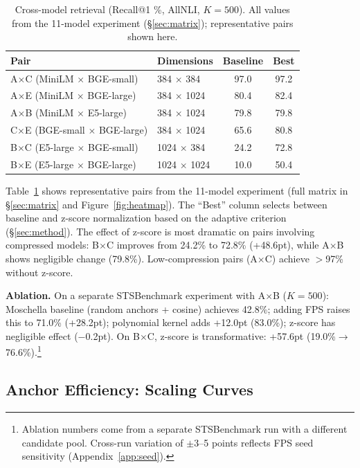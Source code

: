 \documentclass{article}
\begin{document}
\begin{table}[t]
\centering
\caption{Cross-model retrieval (Recall@1 \%, AllNLI, $K{=}500$). All values from the 11-model experiment (\S\ref{sec:matrix}); representative pairs shown here.}
\label{tab:text}
\begin{tabular}{@{}llcc@{}}
\toprule
Pair & Dimensions & Baseline & Best \\
\midrule
A$\times$C (MiniLM $\times$ BGE-small)  & 384 $\times$ 384   & 97.0 & 97.2 \\
A$\times$E (MiniLM $\times$ BGE-large)  & 384 $\times$ 1024  & 80.4 & 82.4 \\
A$\times$B (MiniLM $\times$ E5-large)   & 384 $\times$ 1024  & 79.8 & 79.8 \\
C$\times$E (BGE-small $\times$ BGE-large) & 384 $\times$ 1024 & 65.6 & 80.8 \\
B$\times$C (E5-large $\times$ BGE-small) & 1024 $\times$ 384  & 24.2 & 72.8 \\
B$\times$E (E5-large $\times$ BGE-large) & 1024 $\times$ 1024 & 10.0 & 50.4 \\
\bottomrule
\end{tabular}
\end{table}

Table~\ref{tab:text} shows representative pairs from the 11-model experiment (full matrix in \S\ref{sec:matrix} and Figure~\ref{fig:heatmap}). The ``Best'' column selects between baseline and z-score normalization based on the adaptive criterion (\S\ref{sec:method}). The effect of z-score is most dramatic on pairs involving compressed models: B$\times$C improves from 24.2\% to 72.8\% (+48.6pt), while A$\times$B shows negligible change (79.8\%). Low-compression pairs (A$\times$C) achieve $>$97\% without z-score.

\textbf{Ablation.} On a separate STSBenchmark experiment with A$\times$B ($K{=}500$): Moschella baseline (random anchors + cosine) achieves 42.8\%; adding FPS raises this to 71.0\% (+28.2pt); polynomial kernel adds +12.0pt (83.0\%); z-score has negligible effect ($-$0.2pt). On B$\times$C, z-score is transformative: +57.6pt (19.0\%$\to$76.6\%).\footnote{Ablation numbers come from a separate STSBenchmark run with a different candidate pool. Cross-run variation of $\pm$3--5 points reflects FPS seed sensitivity (Appendix~\ref{app:seed}).}

\subsection{Anchor Efficiency: Scaling Curves}
\label{sec:scaling}
\end{document}
